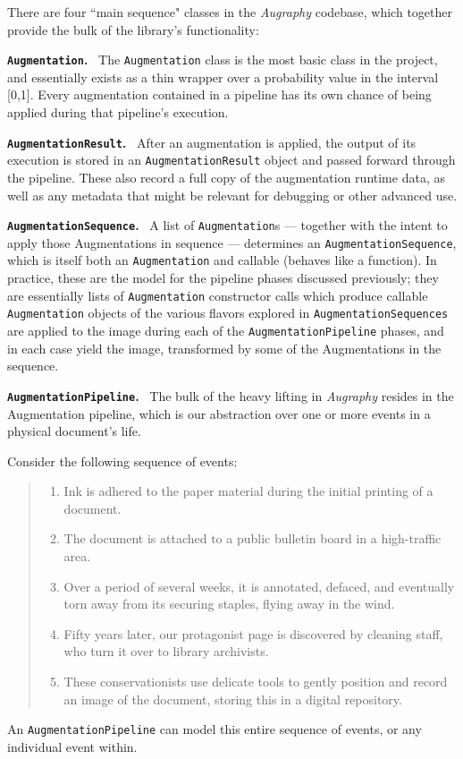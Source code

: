 \documentclass[runningheads]{llncs}
\begin{document}
There are four ``main sequence" classes in the \emph{Augraphy} codebase, which together provide the bulk of the library's functionality:

\smallskip
\noindent\textbf{\texttt{Augmentation}.} ~The \texttt{Augmentation} class is the most basic class in the project, and essentially exists as a thin wrapper over a probability value in the interval [0,1].
Every augmentation contained in a pipeline has its own chance of being applied during that pipeline's execution.

\smallskip
\noindent\textbf{\texttt{AugmentationResult}.} ~After an augmentation is applied, the output of its execution is stored in an \texttt{AugmentationResult} object and passed forward through the pipeline.
These also record a full copy of the augmentation runtime data, as well as any metadata that might be relevant for debugging or other advanced use.

\smallskip
\noindent\textbf{\texttt{AugmentationSequence}.} ~A list of \texttt{Augmentation}s --- together with the intent to apply those Augmentations in sequence --- determines an \texttt{AugmentationSequence}, which is itself both an \texttt{Augmentation} and callable (behaves like a function).
In practice, these are the model for the pipeline phases discussed previously; they are essentially lists of \texttt{Augmentation} constructor calls which produce callable \texttt{Augmentation} objects of the various flavors explored in \texttt{AugmentationSequences} are applied to the image during each of the \texttt{AugmentationPipeline} phases, and in each case yield the image, transformed by some of the Augmentations in the sequence.

\smallskip
\noindent\textbf{\texttt{AugmentationPipeline}.} ~The bulk of the heavy lifting in \emph{Augraphy} resides in the Augmentation pipeline, which is our abstraction over one or more events in a physical document's life.

Consider the following sequence of events:
\begin{quote}
  \begin{enumerate}
  \item Ink is adhered to the paper material during the initial printing of a document.
  \item The document is attached to a public bulletin board in a high-traffic area.
  \item Over a period of several weeks, it is annotated, defaced, and eventually torn away from its securing staples, flying away in the wind.
  \item Fifty years later, our protagonist page is discovered by cleaning staff, who turn it over to library archivists.
  \item These conservationists use delicate tools to gently position and record an image of the document, storing this in a digital repository.
  \end{enumerate}
\end{quote}
An \texttt{AugmentationPipeline} can model this entire sequence of events, or any individual event within.
\end{document}
